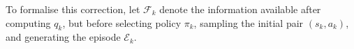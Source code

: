 \documentclass{article}
\begin{document}
To formalise this correction, 
let $\mathcal F_k$ denote the information available after computing $q_k$,
but before selecting policy $\pi_k$, sampling the initial pair $(s_k, a_k)$, and generating the episode $\mathcal E_k$.




\end{document}
